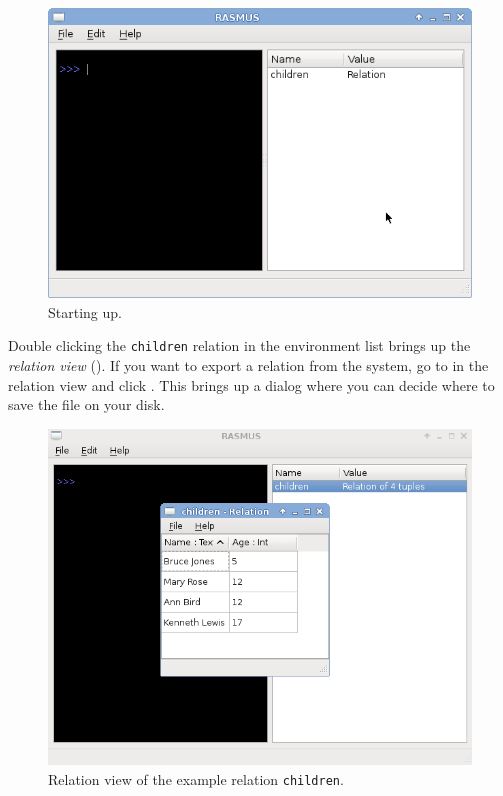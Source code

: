 \documentclass[a4,14pt,latin1]{article}
\begin{document}
\begin{figure}[bp]
  \centerline{\includegraphics[scale=0.5]{persistence_startup.png}}
  \caption{Starting up.}
  \label{fig:startup}
\end{figure}


Double clicking the {\tt children} relation in the environment list
brings up the {\it relation view} (). If
you want to export a relation from the \RAS{} system, go to
 in the relation view and click . This
brings up a dialog where you can decide where to save the file on your
disk.

\begin{figure}
  \centerline{\includegraphics[scale=0.5]{children_relation.png}}
  \caption{Relation view of the example relation {\tt children}.}
  \label{fig:relation_view}
\end{figure}
\end{document}
